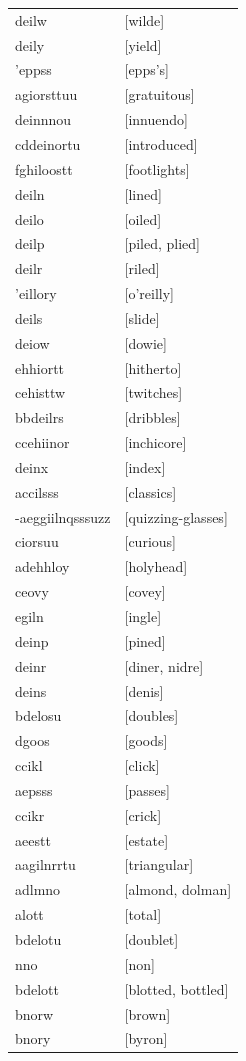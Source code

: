\documentclass{article}
\begin{document}
\begin{tabular}{ll}
deilw & [wilde] \\
deily & [yield] \\
'eppss & [epps's] \\
agiorsttuu & [gratuitous] \\
deinnnou & [innuendo] \\
cddeinortu & [introduced] \\
fghiloostt & [footlights] \\
deiln & [lined] \\
deilo & [oiled] \\
deilp & [piled, plied] \\
deilr & [riled] \\
'eillory & [o'reilly] \\
deils & [slide] \\
deiow & [dowie] \\
ehhiortt & [hitherto] \\
cehisttw & [twitches] \\
bbdeilrs & [dribbles] \\
ccehiinor & [inchicore] \\
deinx & [index] \\
accilsss & [classics] \\
-aeggiilnqsssuzz & [quizzing-glasses] \\
ciorsuu & [curious] \\
adehhloy & [holyhead] \\
ceovy & [covey] \\
egiln & [ingle] \\
deinp & [pined] \\
deinr & [diner, nidre] \\
deins & [denis] \\
bdelosu & [doubles] \\
dgoos & [goods] \\
ccikl & [click] \\
aepsss & [passes] \\
ccikr & [crick] \\
aeestt & [estate] \\
aagilnrrtu & [triangular] \\
adlmno & [almond, dolman] \\
alott & [total] \\
bdelotu & [doublet] \\
nno & [non] \\
bdelott & [blotted, bottled] \\
bnorw & [brown] \\
bnory & [byron] \\

\end{tabular}
\end{document}
